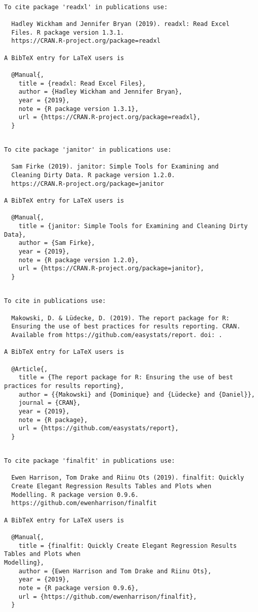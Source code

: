 \documentclass[]{article}
\begin{document}
\begin{verbatim}

To cite package 'readxl' in publications use:

  Hadley Wickham and Jennifer Bryan (2019). readxl: Read Excel
  Files. R package version 1.3.1.
  https://CRAN.R-project.org/package=readxl

A BibTeX entry for LaTeX users is

  @Manual{,
    title = {readxl: Read Excel Files},
    author = {Hadley Wickham and Jennifer Bryan},
    year = {2019},
    note = {R package version 1.3.1},
    url = {https://CRAN.R-project.org/package=readxl},
  }
\end{verbatim}

\begin{verbatim}

To cite package 'janitor' in publications use:

  Sam Firke (2019). janitor: Simple Tools for Examining and
  Cleaning Dirty Data. R package version 1.2.0.
  https://CRAN.R-project.org/package=janitor

A BibTeX entry for LaTeX users is

  @Manual{,
    title = {janitor: Simple Tools for Examining and Cleaning Dirty Data},
    author = {Sam Firke},
    year = {2019},
    note = {R package version 1.2.0},
    url = {https://CRAN.R-project.org/package=janitor},
  }
\end{verbatim}

\begin{verbatim}

To cite in publications use:

  Makowski, D. & Lüdecke, D. (2019). The report package for R:
  Ensuring the use of best practices for results reporting. CRAN.
  Available from https://github.com/easystats/report. doi: .

A BibTeX entry for LaTeX users is

  @Article{,
    title = {The report package for R: Ensuring the use of best practices for results reporting},
    author = {{Makowski} and {Dominique} and {Lüdecke} and {Daniel}},
    journal = {CRAN},
    year = {2019},
    note = {R package},
    url = {https://github.com/easystats/report},
  }
\end{verbatim}

\begin{verbatim}

To cite package 'finalfit' in publications use:

  Ewen Harrison, Tom Drake and Riinu Ots (2019). finalfit: Quickly
  Create Elegant Regression Results Tables and Plots when
  Modelling. R package version 0.9.6.
  https://github.com/ewenharrison/finalfit

A BibTeX entry for LaTeX users is

  @Manual{,
    title = {finalfit: Quickly Create Elegant Regression Results Tables and Plots when
Modelling},
    author = {Ewen Harrison and Tom Drake and Riinu Ots},
    year = {2019},
    note = {R package version 0.9.6},
    url = {https://github.com/ewenharrison/finalfit},
  }
\end{verbatim}
\end{document}
